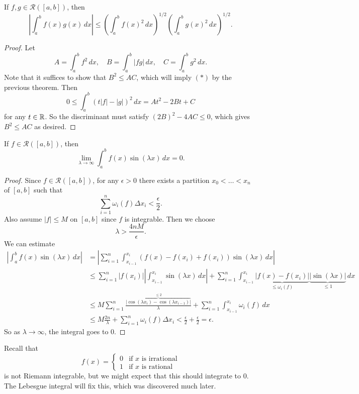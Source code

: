 \begin{example}
  If $f, g \in \mathcal{R}([a, b])$, then
  \[
    \left| \int_a^b f(x) g(x) \, dx \right|
    \le \left( \int_a^b f(x)^2 \, dx \right)^{1/2}
    \left( \int_a^b g(x)^2 \, dx \right)^{1/2}. \tag{*}
  \]
\end{example}

\begin{proof}
  Let
  \[
    A = \int_a^b f^2 \, dx, \quad
    B = \int_a^b |fg| \, dx,\quad
    C = \int_a^b g^2 \, dx.
  \]
  Note that it suffices to
  show that $B^2 \le AC$, which will imply $(*)$
  by the previous theorem. Then
  \[
    0 \le \int_a^b (t|f| - |g|)^2\, dx
    = A t^2 - 2Bt + C
  \]
  for any $t \in \mathbb{R}$. So the discriminant must satisfy
  $(2B)^2 - 4AC \le 0$, which gives $B^2 \le AC$
  as desired.
\end{proof}

\begin{example}
  If $f \in \mathcal{R}([a, b])$, then
  \[
    \lim_{\lambda \to \infty} \int_a^b f(x) \sin(\lambda x) \, dx = 0.
  \]
\end{example}

\begin{proof}
  Since $f \in \mathcal{R}([a, b])$, for any
  $\epsilon > 0$ there exists a partition
  $x_0 < \dots < x_n$ of $[a, b]$ such that
  \[
    \sum_{i = 1}^n \omega_i(f) \Delta x_i < \frac{\epsilon}{2}.
  \]
  Also assume $|f| \le M$ on $[a, b]$ since $f$ is
  integrable. Then we choose
  \[
    \lambda > \frac{4nM}{\epsilon}.
  \]
  We can estimate
  \begin{align*}
    \left| \int_a^b f(x) \sin(\lambda x) \, dx \right|
    &= \left|\sum_{i = 1}^n \int_{x_{i - 1}}^{x_i} (f(x) - f(x_{i}) + f(x_i)) \sin(\lambda x)\, dx\right| \\
    &\le
    \sum_{i = 1}^n |f(x_i)| \left|\int_{x_{i - 1}}^{x_i} \sin(\lambda x)\, dx\right|
    + \sum_{i = 1}^n \int_{x_{i - 1}}^{x_i} \underbrace{|f(x) - f(x_i)|}_{\le \omega_i(f)} \underbrace{|\sin(\lambda x)|}_{\le 1}\, dx \\
    &\le
    M \sum_{i = 1}^n \frac{\overbrace{|\cos(\lambda x_{i}) - \cos(\lambda x_{i - 1})|}^{\le 2}}{\lambda}
    + \sum_{i = 1}^n \int_{x_{i - 1}}^{x_i} \omega_i(f)\, dx \\
    &\le M \frac{2n}{\lambda} + \sum_{i = 1}^n \omega_i(f) \Delta x_i < \frac{\epsilon}{2} + \frac{\epsilon}{2} = \epsilon.
  \end{align*}
  So as $\lambda \to \infty$, the integral goes to $0$.
\end{proof}

\begin{remark}
  Recall that
  \[
    f(x) =
    \begin{cases}
      0 & \text{if } x \text{ is irrational} \\
      1 & \text{if } x \text{ is rational}
    \end{cases}
  \]
  is not Riemann integrable, but we might expect that
  this
  should integrate to $0$. The Lebesgue integral
  will fix this, which was discovered much later.
\end{remark}
